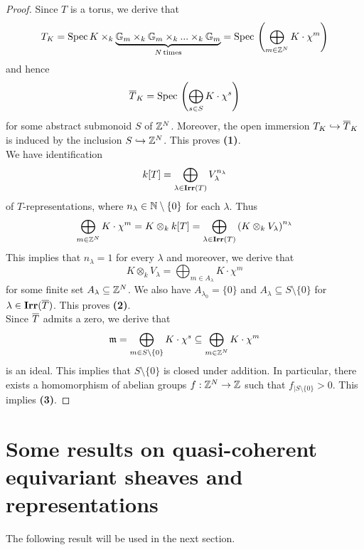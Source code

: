 \begin{proof}
Since $T$ is a torus, we derive that
$$T_K = \mathrm{Spec}\, K \times_k \underbrace{\mathbb{G}_{m}\times_k \mathbb{G}_{m}\times_k ...\times_k \mathbb{G}_{m}}_{N\,\mathrm{times}} = \mathrm{Spec}\, \left(\bigoplus_{m\in {\mathbb Z}^N}K\cdot \chi^m\right)$$
and hence
$$\overline{T}_K = \mathrm{Spec}\, \left(\bigoplus_{s\in S}K\cdot \chi^s\right)$$
for some abstract submonoid $S$ of ${\mathbb Z}^N$. Moreover, the open immersion $T_K\hookrightarrow \overline{T}_K$ is induced by the inclusion $S \hookrightarrow {\mathbb Z}^N$. This proves \textbf{(1)}.\\
We have identification
$$k[T] = \bigoplus_{\lambda\in \mathbf{Irr}(T)}V_{\lambda}^{n_{\lambda}}$$
of $T$-representations, where $n_{\lambda}\in {\mathbb N}\setminus \{0\}$ for each $\lambda$. Thus
$$\bigoplus_{m\in {\mathbb Z}^N}K\cdot \chi^m = K\otimes_kk[T] = \bigoplus_{\lambda\in \mathbf{Irr}(T)}\left(K\otimes_kV_{\lambda}\right)^{n_{\lambda}}$$
This implies that $n_{\lambda} = 1$ for every $\lambda$ and moreover, we derive that
$$K\otimes_kV_{\lambda} = \bigoplus_{m\in A_{\lambda}}K\cdot \chi^m$$
for some finite set $A_{\lambda}\subseteq {\mathbb Z}^N$. We also have $A_{\lambda_0} = \{0\}$ and $A_{\lambda}\subseteq S\setminus \{0\}$ for $\lambda \in \mathbf{Irr}(\overline{T})$. This proves \textbf{(2)}.\\
Since $\overline{T}$ admits a zero, we derive that
$$\mathfrak{m} = \bigoplus_{m \in S\setminus\{0\}}K\cdot \chi^s \subseteq \bigoplus_{m\in {\mathbb Z}^N}K\cdot \chi^m$$
is an ideal. This implies that $S\setminus \{0\}$ is closed under addition. In particular, there exists a homomorphism of abelian groups $f:{\mathbb Z}^N\rightarrow {\mathbb Z}$ such that $f_{\mid S\setminus \{0\}}>0$. This implies \textbf{(3)}.
\end{proof}

\section{Some results on quasi-coherent equivariant sheaves and representations}
\noindent
The following result will be used in the next section.

